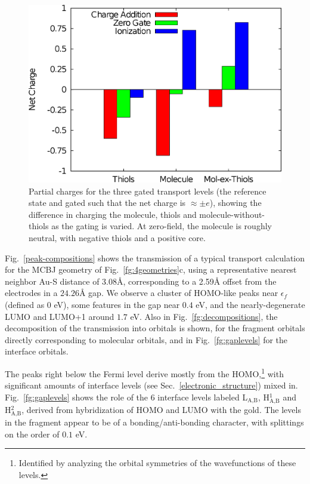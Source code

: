 \documentclass[aip,jcp,a4paper,reprint,floatfix,superscriptaddress]{revtex4-1}
\begin{document}
\begin{figure}
\includegraphics[width=.9\columnwidth]{gating}
\caption{Partial charges for the three gated transport levels (the reference state and gated such that the net charge is $\approx\pm e$), showing the difference in charging the molecule, thiols and molecule-without-thiols as the gating is varied. At zero-field, the molecule is roughly neutral, with negative thiols and a positive core.} \label{fg:gated_charges}
\end{figure}

Fig.~\ref{peak-compositions} shows the transmission of a typical transport calculation for the MCBJ geometry of Fig.~\ref{fg:4geometries}c, using a representative nearest neighbor Au-S distance of 3.08\AA, corresponding to a 2.59\AA\xspace offset from the electrodes in a $24.26$\AA\xspace gap. We observe a cluster of HOMO-like peaks near $\epsilon_f$ (defined as $0$ eV), some features in the gap near $0.4$ eV, and the nearly-degenerate LUMO and LUMO+1 around $1.7$ eV. Also in Fig.~\ref{fg:decompositions}, the decomposition of the transmission into orbitals is shown, for the fragment orbitals directly corresponding to molecular orbitals, and in Fig.~\ref{fg:gaplevels} for the interface orbitals.

The peaks right below the Fermi level derive mostly from the HOMO,\footnote{Identified by analyzing the orbital symmetries of the wavefunctions of these levels.} with significant amounts of interface levels (see Sec.~\ref{electronic_structure}) mixed in.
Fig.~\ref{fg:gaplevels} shows the role of the 6 interface levels labeled L$_\text{A,B}$, H$^1_\text{A,B}$ and H$^2_\text{A,B}$, derived from hybridization of HOMO and LUMO with the gold. The levels in the fragment appear to be of a bonding/anti-bonding character, with splittings on the order of $0.1$ eV.
\end{document}
